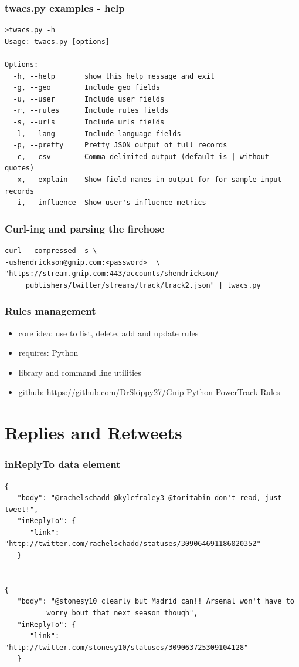 \documentclass{beamer}
\begin{document}
\begin{frame}[fragile]
\frametitle{twacs.py examples - help}
\begin{verbatim}
>twacs.py -h
Usage: twacs.py [options]

Options:
  -h, --help       show this help message and exit
  -g, --geo        Include geo fields
  -u, --user       Include user fields
  -r, --rules      Include rules fields
  -s, --urls       Include urls fields
  -l, --lang       Include language fields
  -p, --pretty     Pretty JSON output of full records
  -c, --csv        Comma-delimited output (default is | without quotes)
  -x, --explain    Show field names in output for for sample input records
  -i, --influence  Show user's influence metrics
\end{verbatim}
\end{frame}


\begin{frame}[fragile]
\frametitle{Curl-ing and parsing the firehose}
\begin{verbatim}
curl --compressed -s \
-ushendrickson@gnip.com:<password>  \
"https://stream.gnip.com:443/accounts/shendrickson/
     publishers/twitter/streams/track/track2.json" | twacs.py
\end{verbatim}
\end{frame}


\begin{frame}\frametitle{Rules management}
\begin{itemize}
\item core idea: use to list, delete, add  and update rules
\item requires: Python
\item library and command line utilities
\item github: https://github.com/DrSkippy27/Gnip-Python-PowerTrack-Rules
\end{itemize}
\end{frame}

\section{Replies and Retweets}

\begin{frame}[fragile]
\frametitle{inReplyTo data element}
\begin{verbatim}
{
   "body": "@rachelschadd @kylefraley3 @toritabin don't read, just tweet!", 
   "inReplyTo": {
      "link": "http://twitter.com/rachelschadd/statuses/309064691186020352"
   }


{
   "body": "@stonesy10 clearly but Madrid can!! Arsenal won't have to 
          worry bout that next season though", 
   "inReplyTo": {
      "link": "http://twitter.com/stonesy10/statuses/309063725309104128"
   }
\end{verbatim}
\end{frame}
\end{document}
